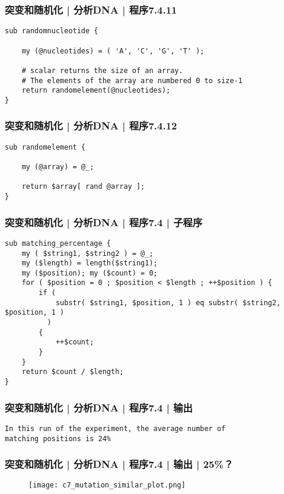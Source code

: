 \begin{frame}[fragile]
  \frametitle{突变和随机化 | 分析DNA | 程序7.4.11}
\begin{lstlisting}[firstnumber=168]
sub randomnucleotide {

    my (@nucleotides) = ( 'A', 'C', 'G', 'T' );

    # scalar returns the size of an array.
    # The elements of the array are numbered 0 to size-1
    return randomelement(@nucleotides);
}
\end{lstlisting}
\end{frame}

\begin{frame}[fragile]
  \frametitle{突变和随机化 | 分析DNA | 程序7.4.12}
\begin{lstlisting}[firstnumber=184]
sub randomelement {

    my (@array) = @_;

    return $array[ rand @array ];
}
\end{lstlisting}
\end{frame}

\begin{frame}[fragile]
  \frametitle{突变和随机化 | 分析DNA | 程序7.4 | \alert{子程序}}
\begin{lstlisting}
sub matching_percentage {
    my ( $string1, $string2 ) = @_;
    my ($length) = length($string1);
    my ($position); my ($count) = 0;
    for ( $position = 0 ; $position < $length ; ++$position ) {
        if (
            substr( $string1, $position, 1 ) eq substr( $string2, $position, 1 )
          )
        {
            ++$count;
        }
    }
    return $count / $length;
}
\end{lstlisting}
\end{frame}

\begin{frame}[fragile]
  \frametitle{突变和随机化 | 分析DNA | 程序7.4 | 输出}
\begin{lstlisting}[firstnumber=1]
In this run of the experiment, the average number of 
matching positions is 24%
\end{lstlisting}
\end{frame}

\begin{frame}
  \frametitle{突变和随机化 | 分析DNA | 程序7.4 | 输出 | 25\%？}
  \begin{figure}
    \centering
    \texttt{[image: c7\_mutation\_similar\_plot.png]}
  \end{figure}
\end{frame}

